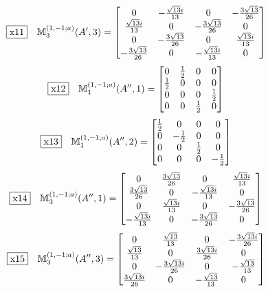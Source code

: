 \documentclass[fleqn,10pt,landscape]{jsarticle}
\begin{document}
\begin{dmath*}
\fbox{x11}\quad \mathbb{M}_{3}^{(1,-1;a)}(A^{\prime},3)=\begin{bmatrix} 0 & - \frac{\sqrt{13} i}{13} & 0 & - \frac{3 \sqrt{13}}{26} \\ \frac{\sqrt{13} i}{13} & 0 & - \frac{3 \sqrt{13}}{26} & 0 \\ 0 & - \frac{3 \sqrt{13}}{26} & 0 & \frac{\sqrt{13} i}{13} \\ - \frac{3 \sqrt{13}}{26} & 0 & - \frac{\sqrt{13} i}{13} & 0 \end{bmatrix}
\end{dmath*}
\begin{dmath*}
\fbox{x12}\quad \mathbb{M}_{1}^{(1,-1;a)}(A^{\prime\prime},1)=\begin{bmatrix} 0 & \frac{1}{2} & 0 & 0 \\ \frac{1}{2} & 0 & 0 & 0 \\ 0 & 0 & 0 & \frac{1}{2} \\ 0 & 0 & \frac{1}{2} & 0 \end{bmatrix}
\end{dmath*}
\begin{dmath*}
\fbox{x13}\quad \mathbb{M}_{1}^{(1,-1;a)}(A^{\prime\prime},2)=\begin{bmatrix} \frac{1}{2} & 0 & 0 & 0 \\ 0 & - \frac{1}{2} & 0 & 0 \\ 0 & 0 & \frac{1}{2} & 0 \\ 0 & 0 & 0 & - \frac{1}{2} \end{bmatrix}
\end{dmath*}
\begin{dmath*}
\fbox{x14}\quad \mathbb{M}_{3}^{(1,-1;a)}(A^{\prime\prime},1)=\begin{bmatrix} 0 & \frac{3 \sqrt{13}}{26} & 0 & \frac{\sqrt{13} i}{13} \\ \frac{3 \sqrt{13}}{26} & 0 & - \frac{\sqrt{13} i}{13} & 0 \\ 0 & \frac{\sqrt{13} i}{13} & 0 & - \frac{3 \sqrt{13}}{26} \\ - \frac{\sqrt{13} i}{13} & 0 & - \frac{3 \sqrt{13}}{26} & 0 \end{bmatrix}
\end{dmath*}
\begin{dmath*}
\fbox{x15}\quad \mathbb{M}_{3}^{(1,-1;a)}(A^{\prime\prime},3)=\begin{bmatrix} 0 & \frac{\sqrt{13}}{13} & 0 & - \frac{3 \sqrt{13} i}{26} \\ \frac{\sqrt{13}}{13} & 0 & \frac{3 \sqrt{13} i}{26} & 0 \\ 0 & - \frac{3 \sqrt{13} i}{26} & 0 & - \frac{\sqrt{13}}{13} \\ \frac{3 \sqrt{13} i}{26} & 0 & - \frac{\sqrt{13}}{13} & 0 \end{bmatrix}
\end{dmath*}
\end{document}
